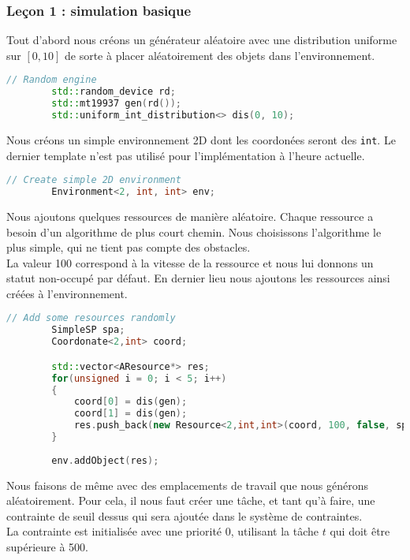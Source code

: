 \subsubsection{Leçon 1 : simulation basique}

Tout d'abord nous créons un générateur aléatoire avec une distribution uniforme sur $[0,10]$ de sorte à placer aléatoirement des objets dans l'environnement.

\begin{lstlisting}[label=nvi_code,caption=Générateur aléatoire,language=C++]
        // Random engine
        std::random_device rd;
        std::mt19937 gen(rd());
        std::uniform_int_distribution<> dis(0, 10);
\end{lstlisting}

Nous créons un simple environnement 2D dont les coordonées seront des \texttt{int}. Le dernier template n'est pas utilisé pour l'implémentation à l'heure actuelle.

\begin{lstlisting}[label=nvi_code,caption=Environnement,language=C++]
        // Create simple 2D environment
        Environment<2, int, int> env;
\end{lstlisting}

Nous ajoutons quelques ressources de manière aléatoire. Chaque ressource a besoin d'un algorithme de plus court chemin. Nous choisissons l'algorithme le plus simple, qui ne tient pas compte des obstacles.\\
La valeur 100 correspond à la vitesse de la ressource et nous lui donnons un statut non-occupé par défaut. En dernier lieu nous ajoutons les ressources ainsi créées à l'environnement.

\begin{lstlisting}[label=nvi_code,caption=Création de ressources,language=C++]       
        // Add some resources randomly
        SimpleSP spa;
        Coordonate<2,int> coord;

        std::vector<AResource*> res;
        for(unsigned i = 0; i < 5; i++)
        {
            coord[0] = dis(gen);
            coord[1] = dis(gen);
            res.push_back(new Resource<2,int,int>(coord, 100, false, spa));
        }
        
        env.addObject(res);
\end{lstlisting}

Nous faisons de même avec des emplacements de travail que nous générons aléatoirement. Pour cela, il nous faut créer une tâche, et tant qu'à faire, une contrainte de seuil dessus qui sera ajoutée dans le système de contraintes.\\
La contrainte est initialisée avec une priorité 0, utilisant la tâche $t$ qui doit être supérieure à 500.

